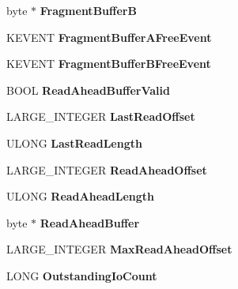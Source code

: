 \begin{DoxyCompactItemize}
byte $\ast$ {\bfseries Fragment\+BufferB}
\item 
\mbox{\label{struct_encrypted_io_queue_ad9be98d14066d978c4c7f5445e79305e}} 
K\+E\+V\+E\+NT {\bfseries Fragment\+Buffer\+A\+Free\+Event}
\item 
\mbox{\label{struct_encrypted_io_queue_a084797ef574b35297b8405970d0c0d82}} 
K\+E\+V\+E\+NT {\bfseries Fragment\+Buffer\+B\+Free\+Event}
\item 
\mbox{\label{struct_encrypted_io_queue_ab6fbb1fbad96d3ef91828ea5a089626d}} 
B\+O\+OL {\bfseries Read\+Ahead\+Buffer\+Valid}
\item 
\mbox{\label{struct_encrypted_io_queue_ab563610ed6ea36f41801b80bc9d33693}} 
L\+A\+R\+G\+E\+\_\+\+I\+N\+T\+E\+G\+ER {\bfseries Last\+Read\+Offset}
\item 
\mbox{\label{struct_encrypted_io_queue_a1f0e512c0577b84f82e0d9183f367b74}} 
U\+L\+O\+NG {\bfseries Last\+Read\+Length}
\item 
\mbox{\label{struct_encrypted_io_queue_afb705d567a4d65b7110769b45524b6ca}} 
L\+A\+R\+G\+E\+\_\+\+I\+N\+T\+E\+G\+ER {\bfseries Read\+Ahead\+Offset}
\item 
\mbox{\label{struct_encrypted_io_queue_a22d3f467e24b7acbb6dd590937b64bdb}} 
U\+L\+O\+NG {\bfseries Read\+Ahead\+Length}
\item 
\mbox{\label{struct_encrypted_io_queue_a9cff34ddd15c737e4c1261fffc837149}} 
byte $\ast$ {\bfseries Read\+Ahead\+Buffer}
\item 
\mbox{\label{struct_encrypted_io_queue_ae474a4e5166aefbc1d1f11c41df60b8d}} 
L\+A\+R\+G\+E\+\_\+\+I\+N\+T\+E\+G\+ER {\bfseries Max\+Read\+Ahead\+Offset}
\item 
\mbox{\label{struct_encrypted_io_queue_a64e95a2550b92f3e9958e1dc68c17e47}} 
L\+O\+NG {\bfseries Outstanding\+Io\+Count}
\item 

\end{DoxyCompactItemize}
